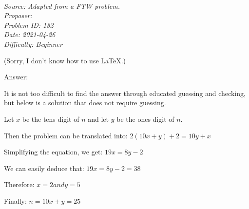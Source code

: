 \SSbreak\\
\emph{Source: Adapted from a FTW problem.}\\
\emph{Proposer: \Pequals}\\ %
\emph{Problem ID: 182}\\
\emph{Date: 2021-04-26}\\
\emph{Difficulty: Beginner}\\
\SSbreak

\bigskip

\begin{solution}\hfil\medskip
	
	(Sorry, I don't know how to use LaTeX.)

Answer: 

It is not too difficult to find the answer through educated guessing and checking, but below is a solution that does not require guessing.

Let $x$ be the tens digit of $n$ and let $y$ be the ones digit of $n$.

Then the problem can be translated into:
$2(10x+y)+2=10y+x$

Simplifying the equation, we get:
$19x=8y-2$

We can easily deduce that:
$19x=8y-2=38$

Therefore:
$x=2 and y=5$

Finally:
$n=10x+y=25$
\end{solution}\bigskip
